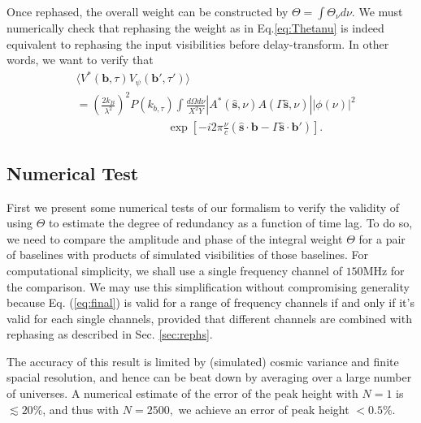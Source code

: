 \documentclass[twocolumn,apj,numberedappendix]{emulateapj}
\renewcommand\[{\begin{equation}}
\renewcommand\]{\end{equation}}
\begin{document}
Once rephased, the overall weight can be constructed by $\Theta=\int \Theta_{\nu}d\nu$. We must numerically check that rephasing the weight as in Eq.\ref{eq:Thetanu} is indeed equivalent to rephasing the input visibilities before delay-transform. In other words, we want to verify that 
\begin{equation}
\begin{aligned} & \langle V^{*}(\boldsymbol{b},\tau)V_{\psi}(\boldsymbol{b'},\tau')\rangle\\
 & =\left(\frac{2k_{B}}{\lambda^{2}}\right)^{2}P(k_{b,\tau})\int\frac{d\Omega d\nu}{X^{2}Y}|A^{*}(\hat{\boldsymbol{s}},\nu)A(\Gamma\hat{\boldsymbol{s}},\nu)||\phi(\nu)|^{2}\\
 & \qquad \qquad \qquad \qquad \exp\left[-i2\pi\frac{\nu}{c}\left(\hat{\boldsymbol{s}}\cdot\boldsymbol{b}-\Gamma\hat{\boldsymbol{s}}\cdot\boldsymbol{b'}\right)\right].\end{aligned}
\label{eq:final}
\end{equation}


\subsection{Numerical Test \label{sec:Techniquet}}

First we present some numerical tests of our formalism to verify the validity of using $\Theta$ to estimate the degree of redundancy as a function of time lag. To do so, we need to compare the amplitude and phase of the integral weight $\Theta$ 
for a pair of baselines with products of simulated visibilities of those baselines. For computational simplicity, we shall use a single frequency channel of $150$MHz for the comparison. We may use this simplification without compromising generality because Eq. (\ref{eq:final}) is valid for a range of frequency channels if and only if it's valid for each single channels, provided that different channels are combined with rephasing as described in Sec. \ref{sec:rephs}. 

 The accuracy of this result is
limited by (simulated) cosmic variance and finite spacial resolution,
and hence can be beat down by averaging over a large number of universes.
A numerical estimate of the error of the peak height with $N=1$ is
$\lesssim20\%$, and thus with $N=2500,$ we achieve an error of peak
height $<0.5\%$. 
\end{document}
